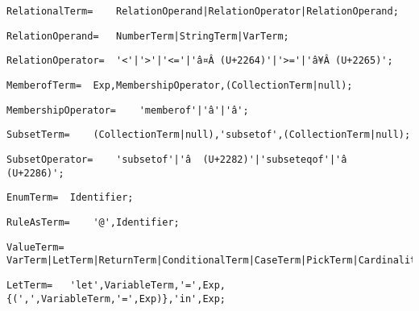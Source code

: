 \documentclass{article}
\begin{document}
    \begin{lstlisting}[mathescape=true]
     RelationalTerm= 	RelationOperand|RelationOperator|RelationOperand;
    \end{lstlisting}
    
    \begin{lstlisting}[mathescape=true]
     RelationOperand= 	NumberTerm|StringTerm|VarTerm;
    \end{lstlisting}
    
    \begin{lstlisting}[mathescape=true]
     RelationOperator= 	'<'|'>'|'<='|'â¤Â (U+2264)'|'>='|'â¥Â (U+2265)';
    \end{lstlisting}
    
    \begin{lstlisting}[mathescape=true]
     MemberofTerm= 	Exp,MembershipOperator,(CollectionTerm|null);
    \end{lstlisting}
    
    \begin{lstlisting}[mathescape=true]
     MembershipOperator= 	'memberof'|'â'|'â';
    \end{lstlisting}
    
    \begin{lstlisting}[mathescape=true]
     SubsetTerm= 	(CollectionTerm|null),'subsetof',(CollectionTerm|null);
    \end{lstlisting}
    
    \begin{lstlisting}[mathescape=true]
     SubsetOperator= 	'subsetof'|'â  (U+2282)'|'subseteqof'|'â  (U+2286)';
    \end{lstlisting}
    
    \begin{lstlisting}[mathescape=true]
     EnumTerm= 	Identifier;
    \end{lstlisting}
    
    \begin{lstlisting}[mathescape=true]
     RuleAsTerm= 	'@',Identifier;
    \end{lstlisting}
    
    \begin{lstlisting}[mathescape=true]
     ValueTerm= 	VarTerm|LetTerm|ReturnTerm|ConditionalTerm|CaseTerm|PickTerm|CardinalityTerm;
    \end{lstlisting}
    
    \begin{lstlisting}[mathescape=true]
     LetTerm= 	'let',VariableTerm,'=',Exp,{(',',VariableTerm,'=',Exp)},'in',Exp;
    \end{lstlisting}
    
\end{document}
